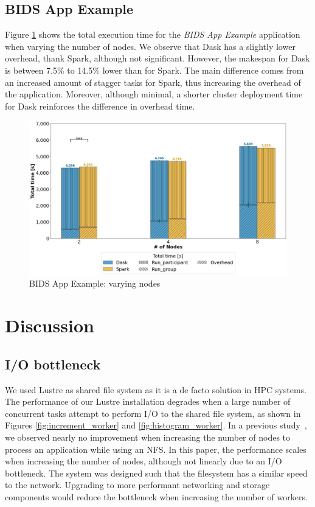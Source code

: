 \documentclass[AMA,STIX1COL]{WileyNJD-v2}
\begin{document}
\subsection{BIDS App Example}
Figure \ref{fig:bids} shows the total execution time for the \textit{BIDS App Example} application when varying the number of nodes.
We observe that Dask has a slightly lower overhead, thank Spark, although not significant.
However, the makespan for Dask is between 7.5\% to 14.5\% lower than for Spark.
The main difference comes from an increased amount of stagger tasks for Spark, thus increasing the overhead of the application.
Moreover, although minimal, a shorter cluster deployment time for Dask reinforces the difference in overhead time.
\begin{figure}[!h]
	\centering
	\includegraphics[clip,width=0.75\columnwidth]{figures/stacked_bids.jpg}
	\caption{BIDS App Example: varying nodes}
	\label{fig:bids}
\end{figure}
													
\section{Discussion}
\subsection{I/O bottleneck}
\label{subsec:io-bottleneck}
We used Lustre as shared file system as it is a de facto solution in HPC systems.
The performance of our Lustre installation degrades when a large number of concurrent tasks attempt to perform I/O to the shared file system, as shown in Figures \ref{fig:increment_worker} and \ref{fig:histogram_worker}.
In a previous study~\cite{8943502}, we observed nearly no improvement when increasing the number of nodes to process an application while using an NFS.
In this paper, the performance scales when increasing the number of nodes, although not linearly due to an I/O bottleneck.
The system was designed such that the filesystem has a similar speed to the network.
Upgrading to more performant networking and storage components would reduce the bottleneck when increasing the number of workers.
							
\end{document}
